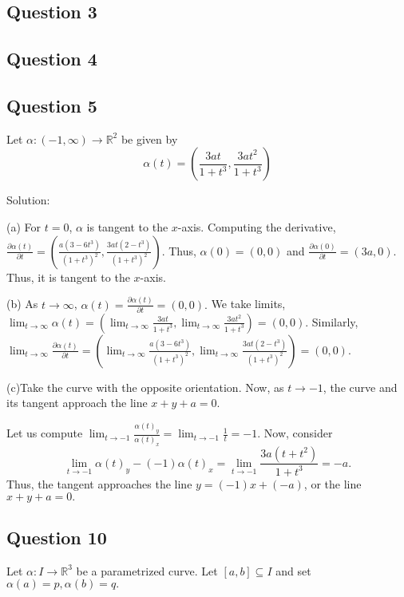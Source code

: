 \documentclass[12pt]{article}
\begin{document}
\subsection*{Question 3}

\subsection*{Question 4}

\subsection*{Question 5}

Let $\alpha : (-1, \infty) \to \mathbb{R}^2$ be given by
\begin{equation*}
     \alpha(t) = \left(\frac{3at}{1+t^3},\frac{3at^2}{1+t^3}\right)
\end{equation*}

Solution:

(a) For $t = 0$, $\alpha$ is tangent to the $x$-axis.
Computing the derivative, $\frac{\partial \alpha(t)}{\partial t} = \left(\frac{a(3 - 6t^3)}{(1+t^3)^2},\frac{3at(2-t^3)}{(1+t^3)^2}\right)$.
Thus, $\alpha(0) = (0,0)$ and $\frac{\partial \alpha(0)}{\partial t} = (3a, 0)$. Thus, it is tangent to the $x$-axis.

(b) As $t \to \infty$, $\alpha(t) = \frac{\partial \alpha(t)}{\partial t} = (0,0).$
We take limits, $\lim_{t\to \infty}\alpha(t) = \left(\lim_{t\to \infty}\frac{3at}{1+t^3},\lim_{t\to\infty}\frac{3at^2}{1+t^3}\right) = (0,0).$
Similarly, $\lim_{t \to \infty} \frac{\partial \alpha(t)}{\partial t} = 
\left(\lim_{t\to \infty}\frac{a(3 - 6t^3)}{(1+t^3)^2},\lim_{t\to \infty}\frac{3at(2-t^3)}{(1+t^3)^2}\right) = (0,0).$

(c)Take the curve with the opposite orientation. 
Now, as $t \to -1$, the curve
and its tangent approach the line $x + y + a = 0$.

Let us compute $\lim_{t\to -1}\frac {\alpha(t)_y}{\alpha(t)_x} = \lim_{t\to -1} \frac 1t = -1.$
Now, consider $$\lim_{t \to -1} \alpha(t)_y - (-1)\alpha(t)_x = \lim_{t\to -1} \frac{3a(t + t^2)}{1 + t^3} = -a.$$
Thus, the tangent approaches the line $y = (-1)x + (-a)$, or the line $x + y + a = 0.$

\subsection*{Question 10}

Let $\alpha: I \to \mathbb{R}^3$ be a parametrized curve.
Let $[a,b] \subseteq I$ and set $\alpha(a) = p, \alpha(b) = q.$
\end{document}
